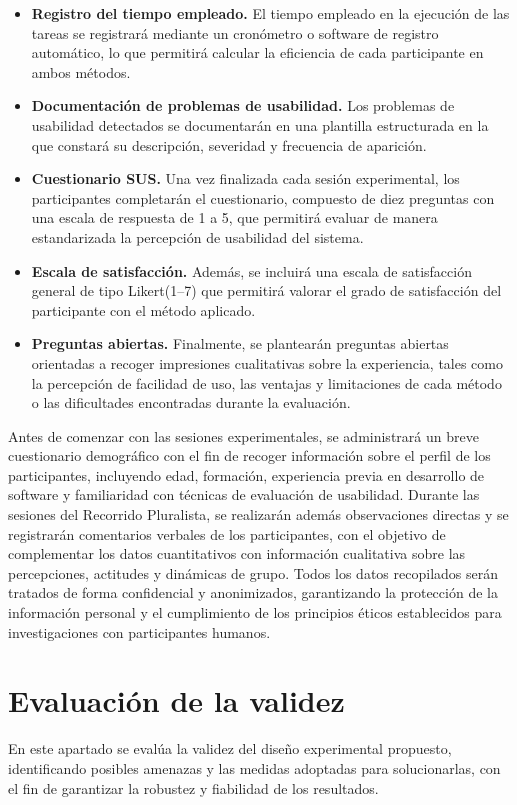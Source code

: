 \documentclass[a4paper,12pt]{report}
\begin{document}
\begin{itemize}
    \item \textbf{Registro del tiempo empleado.} El tiempo empleado en la ejecución de las tareas se registrará mediante un cronómetro o software de registro automático, lo que permitirá calcular la eficiencia de cada participante en ambos métodos. 
    \item \textbf{Documentación de problemas de usabilidad.} Los problemas de usabilidad detectados se documentarán en una plantilla estructurada en la que constará su descripción, severidad y frecuencia de aparición.
    \item \textbf{Cuestionario SUS.} Una vez finalizada cada sesión experimental, los participantes completarán el cuestionario, compuesto de diez preguntas con una escala de respuesta de 1 a 5, que permitirá evaluar de manera estandarizada la percepción de usabilidad del sistema.
    \item \textbf{Escala de satisfacción.} Además, se incluirá una escala de satisfacción general de tipo Likert(1--7) que permitirá valorar el grado de satisfacción del participante con el método aplicado.
    \item \textbf{Preguntas abiertas.} Finalmente, se plantearán preguntas abiertas orientadas a recoger impresiones cualitativas sobre la experiencia, tales como la percepción de facilidad de uso, las ventajas y limitaciones de cada método o las dificultades encontradas durante la evaluación.  
\end{itemize}

Antes de comenzar con las sesiones experimentales, se administrará un breve cuestionario demográfico con el fin de recoger información sobre el perfil de los participantes, incluyendo 
edad, formación, experiencia previa en desarrollo de software y familiaridad con técnicas de evaluación de usabilidad. Durante las 
sesiones del Recorrido Pluralista, se realizarán además observaciones directas y se registrarán comentarios verbales de los participantes, con el objetivo 
de complementar los datos cuantitativos con información cualitativa sobre las percepciones, actitudes y dinámicas de grupo. Todos los datos recopilados 
serán tratados de forma confidencial y anonimizados, garantizando la protección de la información personal y el cumplimiento de los principios éticos establecidos
para investigaciones con participantes humanos.





\section{Evaluación de la validez}
En este apartado se evalúa la validez del diseño experimental propuesto, identificando posibles amenazas y las 
medidas adoptadas para solucionarlas, con el fin de garantizar la robustez y fiabilidad de los resultados.
\end{document}
